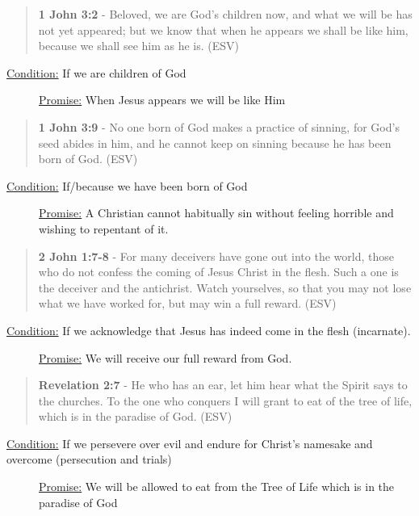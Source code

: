 \documentclass[11pt]{article}
\begin{document}
\begin{quote}
\textbf{1 John 3:2} - Beloved, we are God's children now, and what we will be has not yet appeared; but we know that when he appears we shall be like him, because we shall see him as he is. (ESV)
\end{quote}

\begin{description}
\item[{\uline{Condition:} If we are children of God}] \uline{Promise:} When Jesus appears we will be like Him
\end{description}

\begin{quote}
\textbf{1 John 3:9} - No one born of God makes a practice of sinning, for God's seed abides in him, and he cannot keep on sinning because he has been born of God. (ESV)
\end{quote}

\begin{description}
\item[{\uline{Condition:} If/because we have been born of God}] \uline{Promise:} A Christian cannot habitually sin without feeling horrible and wishing to repentant of it.
\end{description}

\begin{quote}
\textbf{2 John 1:7-8} - For many deceivers have gone out into the world, those who do not confess the coming of Jesus Christ in the flesh. Such a one is the deceiver and the antichrist. Watch yourselves, so that you may not lose what we have worked for, but may win a full reward. (ESV)
\end{quote}

\begin{description}
\item[{\uline{Condition:} If we acknowledge that Jesus has indeed come in the flesh (incarnate).}] \uline{Promise:} We will receive our full reward from God.
\end{description}

\begin{quote}
\textbf{Revelation 2:7} - He who has an ear, let him hear what the Spirit says to the churches. To the one who conquers I will grant to eat of the tree of life, which is in the paradise of God. (ESV)
\end{quote}

\begin{description}
\item[{\uline{Condition:} If we persevere over evil and endure for Christ's namesake and overcome (persecution and trials)}] \uline{Promise:} We will be allowed to eat from the Tree of Life which is in the paradise of God
\end{description}
\end{document}
